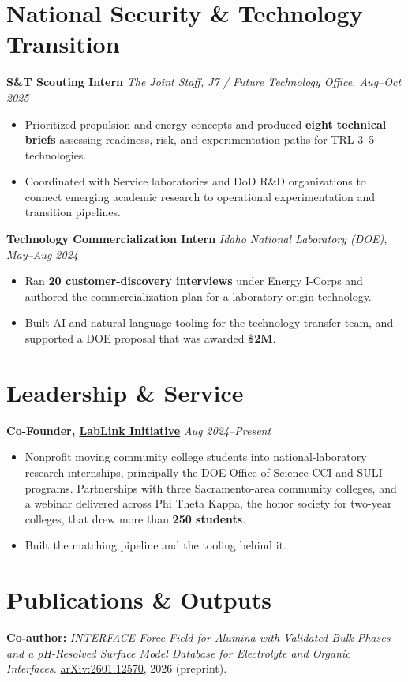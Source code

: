 \documentclass[letterpaper,10pt]{article}
\newcommand{\keep}{\needspace{4\baselineskip}}
\newcommand{\keepsection}{\needspace{6\baselineskip}}
\begin{document}
\keepsection\section*{National Security \& Technology Transition}
\textbf{S\&T Scouting Intern} \hfill \textit{The Joint Staff, J7 / Future Technology Office, Aug--Oct 2025}
\begin{itemize}
    \item Prioritized propulsion and energy concepts and produced \textbf{eight technical briefs} assessing readiness, risk, and experimentation paths for TRL 3--5 technologies.
    \item Coordinated with Service laboratories and DoD R\&D organizations to connect emerging academic research to operational experimentation and transition pipelines.
\end{itemize}

\keep\textbf{Technology Commercialization Intern} \hfill \textit{Idaho National Laboratory (DOE), May--Aug 2024}
\begin{itemize}
    \item Ran \textbf{20 customer-discovery interviews} under Energy I-Corps and authored the commercialization plan for a laboratory-origin technology.
    \item Built AI and natural-language tooling for the technology-transfer team, and supported a DOE proposal that was awarded \textbf{\$2M}.
\end{itemize}

\keepsection\section*{Leadership \& Service}
\textbf{Co-Founder, \href{https://www.lablinkinitiative.org}{LabLink Initiative}} \hfill \textit{Aug 2024--Present}
\begin{itemize}
    \item Nonprofit moving community college students into national-laboratory research internships, principally the DOE Office of Science CCI and SULI programs. Partnerships with three Sacramento-area community colleges, and a webinar delivered across Phi Theta Kappa, the honor society for two-year colleges, that drew more than \textbf{250 students}.
    \item Built the matching pipeline and the tooling behind it.
\end{itemize}

\keepsection\section*{Publications \& Outputs}
\textbf{Co-author:} \textit{INTERFACE Force Field for Alumina with Validated Bulk Phases and a pH-Resolved Surface Model Database for Electrolyte and Organic Interfaces.} \href{https://arxiv.org/abs/2601.12570}{arXiv:2601.12570}, 2026 (preprint).
\end{document}
